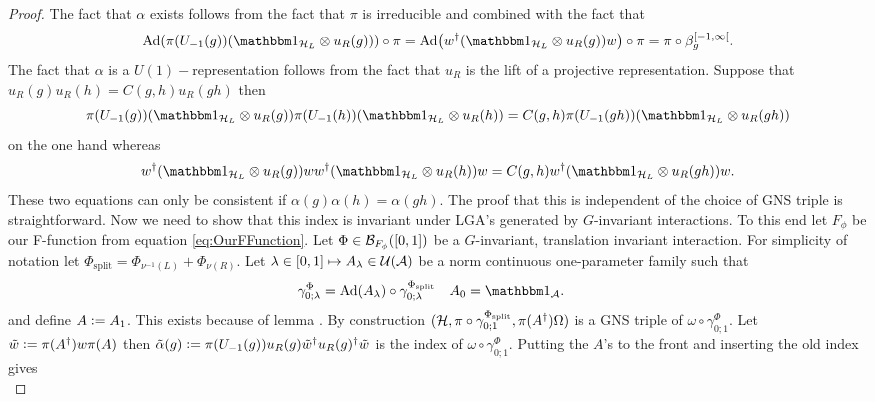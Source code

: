 \documentclass[11pt,a4paper,twoside]{article}
\def\version{1}
\newcommand{\versionDifference}[2]{\ifthenelse{\version=0}{#1}{#2}}
\numberwithin{equation}{section}
\begin{document}
	\begin{proof}
		The fact that $\alpha$ exists follows from the fact that $\pi$ is irreducible and combined with the fact that
		\begin{equation}
			\Ad{\pi(U_{-1}(g)) (\id_{\HH_L}\otimes u_R(g))}\circ\pi=\Ad{w^\dagger(\id_{\HH_L}\otimes u_R(g)) w}\circ\pi=\pi\circ\beta_g^{[-1,\infty[}.
		\end{equation}
		The fact that $\alpha$ is a $U(1)-$representation follows from the fact that $u_R$ is the lift of a projective representation. Suppose that $u_R(g)u_R(h)=C(g,h)u_R(gh)$ then
		\begin{equation}
			\pi(U_{-1}(g)) (\id_{\HH_L}\otimes u_R(g))\pi(U_{-1}(h)) (\id_{\HH_L}\otimes u_R(h))=C(g,h)\pi(U_{-1}(gh)) (\id_{\HH_L}\otimes u_R(gh))
		\end{equation}
		on the one hand whereas
		\begin{equation}
			w^\dagger(\id_{\HH_L}\otimes u_R(g)) ww^\dagger(\id_{\HH_L}\otimes u_R(h)) w=C(g,h)w^\dagger(\id_{\HH_L}\otimes u_R(gh)) w.
		\end{equation}
		These two equations can only be consistent if $\alpha(g)\alpha(h)=\alpha(gh)$. The proof that this is independent of the choice of GNS triple is straightforward. Now we need to show that this index is invariant under LGA's generated by $G$-invariant interactions. To this end let $F_\phi$ be our F-function from equation \eqref{eq:OurFFunction}. Let $\Phi\in\mathcal B_{F_\phi}([0,1])$ be a $G$-invariant, translation invariant interaction. For simplicity of notation let $\Phi_{\text{split}}=\Phi_{\nu^{-1}(L)}+\Phi_{\nu(R)}$. Let $\lambda\in[0,1]\mapsto A_\lambda\in\mathcal U(\mathcal A)$ be a norm continuous one-parameter family such that
		\begin{align}\label{eq:DefinitionSplitting1DAppendix}
			\gamma^\Phi_{0;\lambda}&=\Ad{A_\lambda}\circ\gamma^{\Phi_{\text{split}}}_{0;\lambda}&A_0&=\id_\AA.
		\end{align}
		and define $A\vcentcolon= A_1$. This exists because of lemma \versionDifference{\ref{lem:PropertiesLocallyGeneratedAutomorphisms1d}}{B.1. of \cite{jappens2023spt}}. By construction $(\mathcal H,\pi\circ\gamma^{\Phi_{\text{split}}}_{0;1},\pi(A^\dagger)\Omega)$ is a GNS triple of $\omega\circ\gamma^\Phi_{0;1}$. Let $\tilde{w}\vcentcolon= \pi(A^\dagger)w\pi(A)$ then $\tilde{\alpha}(g)\vcentcolon= \pi(U_{-1}(g))u_R(g)\tilde{w}^\dagger u_R(g)^\dagger \tilde{w}$ is the index of $\omega\circ\gamma^\Phi_{0;1}$. Putting the $A$'s to the front and inserting the old index gives
		\begin{equation}

\end{equation}
\end{proof}
\end{document}
